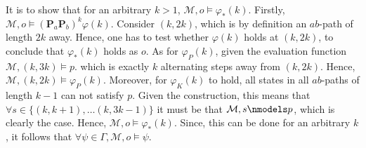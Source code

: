 \documentclass[11pt,a4paper]{article}
\newcommand{\esome}{\mathbf{P}}
\begin{document}
It is to show that for an arbitrary $k>1$, $\mathcal{M},o \models \varphi_*(k)$.
Firstly, $\mathcal{M},o \models (\esome_a \esome_b)^k \varphi(k)$. Consider $(k,2k)$, which is by definition an $ab$-path of length $2k$ away. Hence, one has to test whether $\varphi(k)$ holds at $(k,2k)$, to conclude that $\varphi_*(k)$ holds as $o$. As for $\varphi_{P}(k)$, given the evaluation function $\mathcal{M}, (k,3k) \models p$. which is exactly $k$ alternating steps away from $(k,2k)$. Hence, $\mathcal{M}, (k,2k) \models \varphi_{P}(k)$. Moreover, for $\varphi_{K}(k)$ to hold, all states in all $ab$-paths of length $k-1$ can not satisfy $p$. Given the construction, this means that $\forall s \in \{(k,k+1), \dots (k,3k-1)\}$ it must be that $\mathcal{M},s \nmodels p$, which is clearly the case. Hence, $\mathcal{M},o \models \varphi_*(k)$.
Since, this can be done for an arbitrary $k$, it follows that $\forall \psi \in \Gamma, \mathcal{M}, o \models \psi$.
\end{document}
